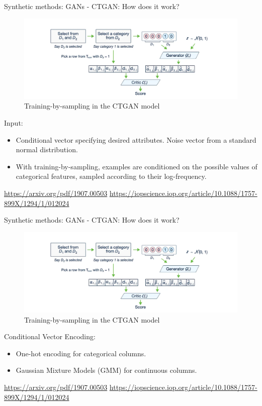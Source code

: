 \documentclass[
	aspectratio = 169
 ]{beamer}
\begin{document}
\begin{frame}{Synthetic methods: GANs - CTGAN: How does it work?}
     
      \begin{figure}
      \centering
      \includegraphics[width=0.6\linewidth]{Presentation TEX/gallery/training-by-sampling.png}
  \caption{Training-by-sampling in the CTGAN model}
  \end{figure}
      Input:
    \begin{itemize}
        \item Conditional vector specifying desired attributes. Noise vector from a standard normal distribution.
        \item With training-by-sampling, examples are conditioned on the possible values of categorical features, sampled according to their log-frequency. 
    \end{itemize}
\vspace{2.5mm}
\newline
\tiny{\url{https://arxiv.org/pdf/1907.00503}}
\newline
\tiny{\url{https://iopscience.iop.org/article/10.1088/1757-899X/1294/1/012024}}

\end{frame}
\begin{frame}{Synthetic methods: GANs - CTGAN: How does it work?}

      \begin{figure}
      \centering
      \includegraphics[width=0.6\linewidth]{Presentation TEX/gallery/training-by-sampling.png}
  \caption{Training-by-sampling in the CTGAN model}
  \end{figure}
      Conditional Vector Encoding:
    \begin{itemize}
        \item One-hot encoding for categorical columns.
        \item Gaussian Mixture Models (GMM) for continuous columns.
    \end{itemize}
\vspace{2.5mm}
\newline
\tiny{\url{https://arxiv.org/pdf/1907.00503}}
\newline
\tiny{\url{https://iopscience.iop.org/article/10.1088/1757-899X/1294/1/012024}}

\end{frame}
\end{document}
